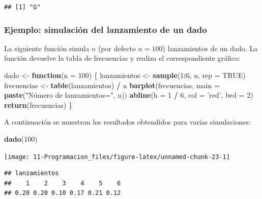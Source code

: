 \documentclass[]{book}
\newenvironment{Shaded}{\begin{snugshade}}{\end{snugshade}}
\newcommand{\KeywordTok}[1]{\textcolor[rgb]{0.13,0.29,0.53}{\textbf{#1}}}
\newcommand{\DataTypeTok}[1]{\textcolor[rgb]{0.13,0.29,0.53}{#1}}
\newcommand{\DecValTok}[1]{\textcolor[rgb]{0.00,0.00,0.81}{#1}}
\newcommand{\StringTok}[1]{\textcolor[rgb]{0.31,0.60,0.02}{#1}}
\newcommand{\OtherTok}[1]{\textcolor[rgb]{0.56,0.35,0.01}{#1}}
\newcommand{\ControlFlowTok}[1]{\textcolor[rgb]{0.13,0.29,0.53}{\textbf{#1}}}
\newcommand{\OperatorTok}[1]{\textcolor[rgb]{0.81,0.36,0.00}{\textbf{#1}}}
\newcommand{\NormalTok}[1]{#1}
\begin{document}
\begin{verbatim}
## [1] "G"
\end{verbatim}

\subsubsection{Ejemplo: simulación del lanzamiento de un
dado}\label{ejemplo-simulacion-del-lanzamiento-de-un-dado}

La siguiente función simula \(n\) (por defecto \(n=100\)) lanzamientos
de un dado. La función devuelve la tabla de frecuencias y realiza el
correspondiente gráfico:

\begin{Shaded}
\begin{Highlighting}[]
\NormalTok{dado <-}\StringTok{ }\ControlFlowTok{function}\NormalTok{(}\DataTypeTok{n =} \DecValTok{100}\NormalTok{) \{}
\NormalTok{  lanzamientos <-}\StringTok{ }\KeywordTok{sample}\NormalTok{(}\DecValTok{1}\OperatorTok{:}\DecValTok{6}\NormalTok{, n, }\DataTypeTok{rep =} \OtherTok{TRUE}\NormalTok{)}
\NormalTok{  frecuencias <-}\StringTok{ }\KeywordTok{table}\NormalTok{(lanzamientos) }\OperatorTok{/}\StringTok{ }\NormalTok{n}
  \KeywordTok{barplot}\NormalTok{(frecuencias, }\DataTypeTok{main =} \KeywordTok{paste}\NormalTok{(}\StringTok{"Número de lanzamientos="}\NormalTok{, n))}
  \KeywordTok{abline}\NormalTok{(}\DataTypeTok{h =} \DecValTok{1} \OperatorTok{/}\StringTok{ }\DecValTok{6}\NormalTok{, }\DataTypeTok{col =} \StringTok{'red'}\NormalTok{, }\DataTypeTok{lwd =} \DecValTok{2}\NormalTok{)}
  \KeywordTok{return}\NormalTok{(frecuencias)}
\NormalTok{\}}
\end{Highlighting}
\end{Shaded}

A continuación se muestran los resultados obtendidos para varias
simulaciones:

\begin{Shaded}
\begin{Highlighting}[]
\KeywordTok{dado}\NormalTok{(}\DecValTok{100}\NormalTok{)}
\end{Highlighting}
\end{Shaded}

\begin{center}\texttt{[image: 11-Programacion\_files/figure-latex/unnamed-chunk-23-1]} \end{center}

\begin{verbatim}
## lanzamientos
##    1    2    3    4    5    6 
## 0.20 0.20 0.10 0.17 0.21 0.12
\end{verbatim}
\end{document}
